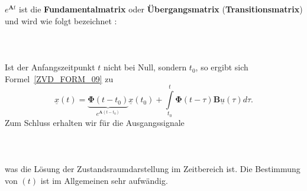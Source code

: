 \\~\\
$e^{\boldsymbol{A}t}$ ist die {\bf Fundamentalmatrix} oder {\bf \"Ubergangsmatrix} ({\bf Transitionsmatrix}) und wird wie folgt bezeichnet \cite{UNB:89}:\\~\\
\\~\\
Ist der Anfangszeitpunkt $t$ nicht bei Null, sondern $t_0$, so ergibt sich Formel~\ref{ZVD_FORM_09} zu
\begin{equation*}
\underline{x}(t)=\underbrace{\boldsymbol{\Phi}(t-t_0)}_{e^{\boldsymbol{A}(t-t_0)}}\underline{x}(t_0)+\int\limits_{t_0}^{t}\boldsymbol{\Phi}(t-\tau)\boldsymbol{B}\underline{u}(\tau)d\tau.
\end{equation*}
Zum Schluss erhalten wir f\"ur die Ausgangssignale \cite{LUT:WEN:05}\\~\\
\\~\\
was die L\"osung der Zustandsraumdarstellung im Zeitbereich ist. Die Bestimmung von \mat{\Phi}$(t)$ ist im Allgemeinen sehr aufw\"andig.

